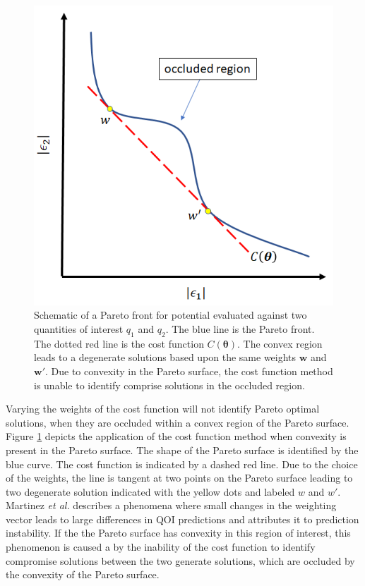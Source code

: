 \begin{figure}[htbp]
	\centering
  \includegraphics[width=5in]{chapter3/img/fig_pareto_convex}
  \caption{Schematic of a Pareto front for potential evaluated against two quantities of interest $q_1$ and $q_2$.  The blue line is the Pareto front.  The dotted red line is the cost function $C(\bm{\theta})$.  The convex region leads to a degenerate solutions based upon the same weights  $\bm{w}$ and $\bm{w}'$.  Due to convexity in the Pareto surface, the cost function method is unable to identify comprise solutions in the occluded region.}
  \label{fig:pareto_convex}
\end{figure}

Varying the weights of the cost function will not identify Pareto optimal solutions, when they are occluded within a convex region of the Pareto surface.  Figure \ref{fig:pareto_convex} depicts the application of the cost function method when convexity is present in the Pareto surface.  The shape of the Pareto surface is identified by the blue curve.  The cost function is indicated by a dashed red line.  Due to the choice of the weights, the line is tangent at two points on the Pareto surface leading to two degenerate solution indicated with the yellow dots and labeled $w$ and $w'$.  Martinez \emph{et al.}\cite{martinez2013_fitting} describes a phenomena where small changes in the weighting vector leads to large differences in QOI predictions and attributes it to prediction instability.  If the the Pareto surface has convexity in this region of interest, this phenomenon is caused a by the inability of the cost function to identify compromise solutions between the two generate solutions, which are occluded by the convexity of the Pareto surface.

